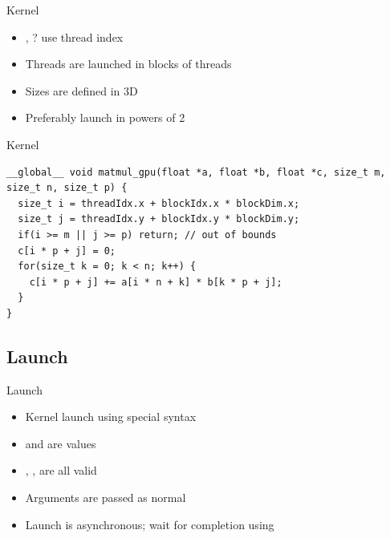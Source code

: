 \begin{frame}[fragile]{Kernel}
    \center
    \begin{itemize}
        \item<1-> , ? \textrightarrow use thread index
        \item<2-> Threads are launched in blocks of threads
        \item<3-> Sizes are defined in 3D
        \item<4-> Preferably launch in powers of 2
    \end{itemize}
\end{frame}

\begin{frame}[fragile]{Kernel}
    \center
    \begin{verbatim}
__global__ void matmul_gpu(float *a, float *b, float *c, size_t m, size_t n, size_t p) {
  size_t i = threadIdx.x + blockIdx.x * blockDim.x;
  size_t j = threadIdx.y + blockIdx.y * blockDim.y;
  if(i >= m || j >= p) return; // out of bounds
  c[i * p + j] = 0;
  for(size_t k = 0; k < n; k++) {
    c[i * p + j] += a[i * n + k] * b[k * p + j];
  }
}
    \end{verbatim}
\end{frame}

\subsection{Launch}\label{subsec:launch}
\begin{frame}[fragile]{Launch}
    \center
    \begin{itemize}
        \item<1-> Kernel launch using special syntax \CUDA{<<<>>>}
    \end{itemize}
    \begin{itemize}
        \item<3->  and  are  values
        \item<4-> , ,  are all valid
        \item<5-> Arguments are passed as normal
        \item<6-> Launch is asynchronous; wait for completion using 
    \end{itemize}
\end{frame}

